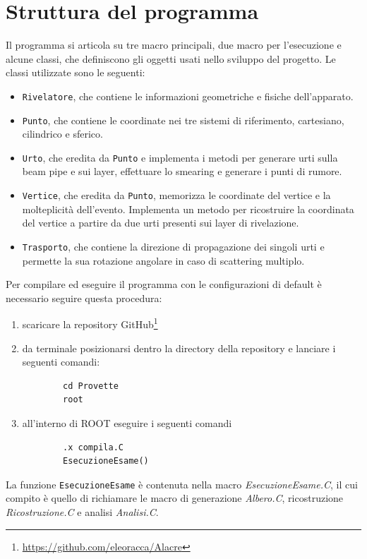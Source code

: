 \documentclass[11pt,a4paper]{article}
\begin{document}
\section{Struttura del programma}
\par Il programma si articola su tre macro principali, due macro per l'esecuzione e alcune classi, che definiscono gli oggetti usati nello sviluppo del progetto. Le classi utilizzate sono le seguenti:
\begin{itemize}
\item \lstinline{Rivelatore}, che contiene le informazioni geometriche e fisiche dell'apparato.
\item \lstinline{Punto}, che contiene le coordinate nei tre sistemi di riferimento, cartesiano, cilindrico e sferico.
\item \lstinline{Urto}, che eredita da \lstinline{Punto} e implementa i metodi per generare urti sulla beam pipe e sui layer, effettuare lo smearing e generare i punti di rumore.
\item \lstinline{Vertice}, che eredita da \lstinline{Punto}, memorizza le coordinate del vertice e la molteplicità dell'evento. Implementa un metodo per ricostruire la coordinata del vertice a partire da due urti presenti sui layer di rivelazione.
\item \lstinline{Trasporto}, che contiene la direzione di propagazione dei singoli urti e permette la sua rotazione angolare in caso di scattering multiplo.
\end{itemize}
Per compilare ed eseguire il programma con le configurazioni di default è necessario seguire questa procedura:
\begin{enumerate}
    \item scaricare la repository GitHub\footnote{\url{https://github.com/eleoracca/Alacre}}
    \item da terminale posizionarsi dentro la directory della repository e lanciare i seguenti comandi:
    \begin{lstlisting}
        cd Provette
        root
    \end{lstlisting}
    \item all'interno di ROOT eseguire i seguenti comandi
    \begin{lstlisting}
        .x compila.C
        EsecuzioneEsame()
    \end{lstlisting}
\end{enumerate}
\par La funzione \lstinline{EsecuzioneEsame} è contenuta nella macro \textit{EsecuzioneEsame.C}, il cui compito è quello di richiamare le macro di generazione \textit{Albero.C}, ricostruzione \textit{Ricostruzione.C} e analisi \textit{Analisi.C}.\\
\end{document}
